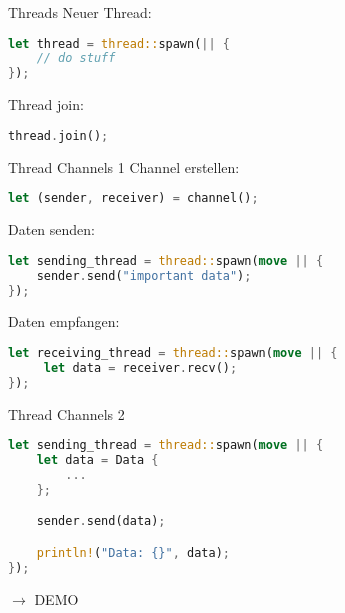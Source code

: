 
\begin{frame}[fragile,t]{Threads}
    Neuer Thread:
    \begin{lstlisting}[language=Rust,escapechar=@,label={lst:threads1-1}]
let thread = thread::spawn(|| {
    // do stuff
});\end{lstlisting}

    \pause
    Thread join:
    \begin{lstlisting}[language=Rust,escapechar=@,label={lst:threads1-2}]
thread.join();
\end{lstlisting}

\end{frame}

\begin{frame}[fragile,t]{Thread Channels 1}
    Channel erstellen:
    \begin{lstlisting}[language=Rust,escapechar=@,label={lst:thread-channels-1-1}]
let (sender, receiver) = channel();
\end{lstlisting}

    \pause
    Daten senden:
    \begin{lstlisting}[language=Rust,escapechar=@,label={lst:thread-channels-1-2}]
let sending_thread = thread::spawn(move || {
    sender.send("important data");
});\end{lstlisting}

    \pause
    Daten empfangen:
    \begin{lstlisting}[language=Rust,escapechar=@,label={lst:thread-channels-1-3}]
let receiving_thread = thread::spawn(move || {
     let data = receiver.recv();
});\end{lstlisting}
\end{frame}

\begin{frame}[fragile,t]{Thread Channels 2}
    \begin{lstlisting}[language=Rust,escapechar=@,label={lst:thread-channels-2-1}]
let sending_thread = thread::spawn(move || {
    let data = Data {
        ...
    };

    sender.send(data);

    println!("Data: {}", data);
});\end{lstlisting}

    \pause
    $\longrightarrow$ DEMO
\end{frame}
